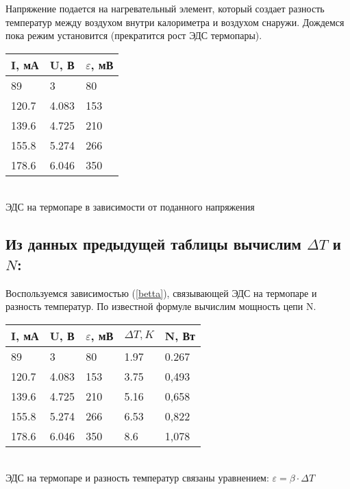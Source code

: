 \documentclass[a4paper,17pt]{article}
\begin{document}
    Напряжение подается на нагревательный элемент, который создает разность температур между воздухом внутри калориметра и воздухом снаружи.
    Дождемся пока режим установится (прекратится рост ЭДС термопары).
    
        \begin{center}
            \begin{tabular}{ | l | l | l |}
                \hline
                I, мА & U, В & $\varepsilon$, мВ \\ \hline
                89      &   3       &   80  \\
                120.7   &   4.083   &   153 \\
                139.6   &   4.725   &   210 \\
                155.8   &   5.274   &   266 \\
                178.6   &   6.046   &   350 \\
                \hline
            \end{tabular}\\
            
            ЭДС на термопаре в зависимости от поданного напряжения
        \end{center}
    
    \subsection{Из данных предыдущей таблицы вычислим $\Delta T$ и $N$:}
    Воспользуемся зависимостью (\ref{betta}), связывающей ЭДС на термопаре и разность температур. По известной формуле вычислим мощность цепи N.
    
        \begin{center}
            \begin{tabular}{ | l | l | l | l | l |}
                \hline
                I, мА & U, В & $\varepsilon$, мВ & $\Delta T, K$ & N, Вт\\ \hline
                89      &   3       &   80  &   1.97    &   0.267\\
                120.7   &   4.083   &   153 &   3.75    &   0,493\\
                139.6   &   4.725   &   210 &   5.16    &   0,658\\
                155.8   &   5.274   &   266 &   6.53    &   0,822\\
                178.6   &   6.046   &   350 &   8.6     &   1,078\\
                \hline
            \end{tabular}\\
            
            ЭДС на термопаре и разность температур связаны уравнением: $\varepsilon = \beta \cdot \Delta T$
        \end{center}
        
\end{document}
